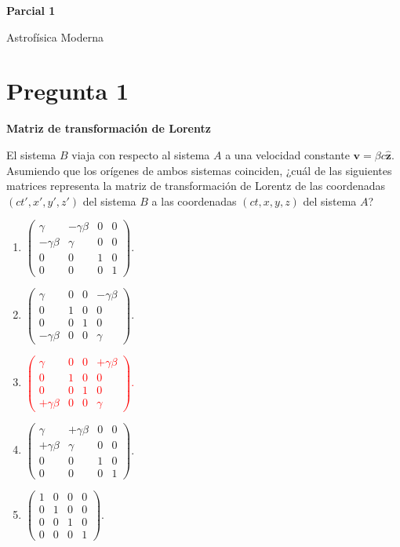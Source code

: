 \documentclass[a4paper,11pt]{article}
\newcommand{\pregunta}[2]{\section*{Pregunta #1}\textbf{#2}\par}
\begin{document}
\begin{center}
    {\LARGE\bfseries Parcial 1\par}
    \medskip
    {\large Astrofísica Moderna\par}
\end{center}

\pregunta{1}{Matriz de transformación de Lorentz}

El sistema $B$ viaja con respecto al sistema $A$ a una velocidad constante $\mathbf{v}=\beta c\hat{\mathbf{z}}$. Asumiendo que los orígenes de ambos sistemas coinciden, ¿cuál de las siguientes matrices representa la matriz de transformación de Lorentz de las coordenadas $(ct',x',y',z')$ del sistema $B$ a las coordenadas $(ct,x,y,z)$ del sistema $A$?

\begin{enumerate}[itemsep=1em]
    \item $\displaystyle
    \begin{pmatrix}
        \gamma & -\gamma\beta & 0 & 0 \\
        -\gamma\beta & \gamma & 0 & 0 \\
        0 & 0 & 1 & 0 \\
        0 & 0 & 0 & 1
    \end{pmatrix}$.
    \item $\displaystyle
    \begin{pmatrix}
        \gamma & 0 & 0 & -\gamma\beta \\
        0 & 1 & 0 & 0 \\
        0 & 0 & 1 & 0 \\
        -\gamma\beta & 0 & 0 & \gamma
    \end{pmatrix}$.
    \item \textcolor{red}{$\displaystyle
    \begin{pmatrix}
        \gamma & 0 & 0 & +\gamma\beta \\
        0 & 1 & 0 & 0 \\
        0 & 0 & 1 & 0 \\
        +\gamma\beta & 0 & 0 & \gamma
    \end{pmatrix}$.}
    \item $\displaystyle
    \begin{pmatrix}
        \gamma & +\gamma\beta & 0 & 0 \\
        +\gamma\beta & \gamma & 0 & 0 \\
        0 & 0 & 1 & 0 \\
        0 & 0 & 0 & 1
    \end{pmatrix}$.
    \item $\displaystyle
    \begin{pmatrix}
        1 & 0 & 0 & 0 \\
        0 & 1 & 0 & 0 \\
        0 & 0 & 1 & 0 \\
        0 & 0 & 0 & 1
    \end{pmatrix}$.
\end{enumerate}
\end{document}
